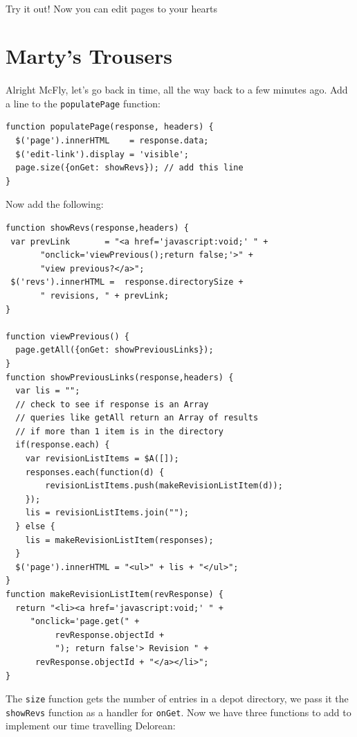 \documentclass{report}
\begin{document}
\paragraph{}
Try it out! Now you can edit pages to your hearts

\section{Marty's Trousers}
\paragraph{}
Alright McFly, let's go back in time, all the way back to a few
minutes ago. Add a line to the \texttt{populatePage} function:
\begin{Verbatim}[frame=single]
function populatePage(response, headers) {
  $('page').innerHTML    = response.data;
  $('edit-link').display = 'visible';
  page.size({onGet: showRevs}); // add this line
}
\end{Verbatim}

Now add the following: 
\begin{Verbatim}[frame=single]
function showRevs(response,headers) {
 var prevLink       = "<a href='javascript:void;' " + 
       "onclick='viewPrevious();return false;'>" + 
       "view previous?</a>";
 $('revs').innerHTML =  response.directorySize + 
       " revisions, " + prevLink;
}

function viewPrevious() {
  page.getAll({onGet: showPreviousLinks});
}
function showPreviousLinks(response,headers) {
  var lis = "";
  // check to see if response is an Array
  // queries like getAll return an Array of results 
  // if more than 1 item is in the directory
  if(response.each) {
    var revisionListItems = $A([]);
    responses.each(function(d) {
        revisionListItems.push(makeRevisionListItem(d));
    });      
    lis = revisionListItems.join("");
  } else {
    lis = makeRevisionListItem(responses);
  }
  $('page').innerHTML = "<ul>" + lis + "</ul>";
}
function makeRevisionListItem(revResponse) {
  return "<li><a href='javascript:void;' " + 
	 "onclick='page.get(" + 
          revResponse.objectId + 
          "); return false'> Revision " + 
	  revResponse.objectId + "</a></li>";
}
\end{Verbatim}

The \texttt{size} function gets the number of entries in a depot
directory, we pass it the \texttt{showRevs} function as a handler for
\texttt{onGet}. Now we have three functions to add to implement our
time travelling Delorean:
\end{document}
